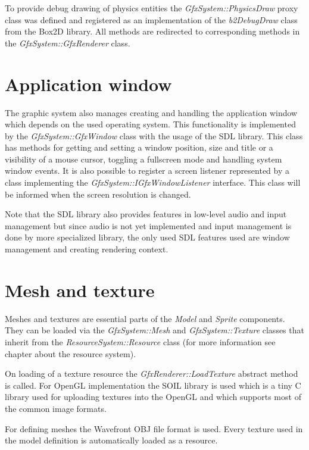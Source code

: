 To provide debug drawing of physics entities the \emph{GfxSystem::PhysicsDraw} proxy class was defined and registered as an implementation of the \emph{b2\-Debug\-Draw} class from the Box2D library. All methods are redirected to corresponding methods in the \emph{GfxSystem::GfxRenderer} class.

\section{Application window}

The graphic system also manages creating and handling the application window which depends on the used operating system. This functionality is implemented by the \emph{GfxSystem::GfxWindow} class with the usage of the SDL library. This class has methods for getting and setting a window position, size and title or a visibility of a mouse cursor, toggling a fullscreen mode and handling system window events. It is also possible to register a screen listener represented by a class implementing the \emph{GfxSystem::IGfxWindowListener} interface. This class will be informed when the screen resolution is changed.

Note that the SDL library also provides features in low-level audio and input management but since audio is not yet implemented and input management is done by more specialized library, the only used SDL features used are window management and creating rendering context.

\section{Mesh and texture}

Meshes and textures are essential parts of the \emph{Model} and \emph{Sprite} components. They can be loaded via the \emph{GfxSystem::Mesh} and \emph{GfxSystem::Texture} classes that inherit from the \emph{ResourceSystem::Resource} class (for more information see chapter about the resource system).

On loading of a texture resource the \emph{GfxRenderer::LoadTexture} abstract method is called. For OpenGL implementation the SOIL library is used which is a tiny C library used for uploading textures into the OpenGL and which supports most of the common image formats.

For defining meshes the Wavefront OBJ file format \cite{obj} is used. Every texture used in the model definition is automatically loaded as a resource.
 
